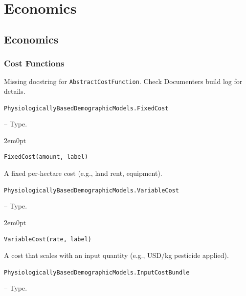 \chapter{Economics}


\section{Economics}



\label{17967258113914826145}{}


\subsection{Cost Functions}



\label{575900203848540660}{}


\begin{tcolorbox}[toptitle=-1mm,bottomtitle=1mm,colback=admonition-warning!50!white,colframe=admonition-warning,title=\textbf{Missing docstring.}]
Missing docstring for \texttt{AbstractCostFunction}. Check Documenter{\textquotesingle}s build log for details.

\end{tcolorbox}

\hypertarget{10160515078250520182}{\texttt{PhysiologicallyBasedDemographicModels.FixedCost}}  -- {Type.}

\begin{adjustwidth}{2em}{0pt}


\begin{verbatim}
FixedCost(amount, label)
\end{verbatim}

A fixed per-hectare cost (e.g., land rent, equipment).



\end{adjustwidth}
\hypertarget{9511612307989374858}{\texttt{PhysiologicallyBasedDemographicModels.VariableCost}}  -- {Type.}

\begin{adjustwidth}{2em}{0pt}


\begin{verbatim}
VariableCost(rate, label)
\end{verbatim}

A cost that scales with an input quantity (e.g., USD/kg pesticide applied).



\end{adjustwidth}
\hypertarget{17852759881239576684}{\texttt{PhysiologicallyBasedDemographicModels.InputCostBundle}}  -- {Type.}

